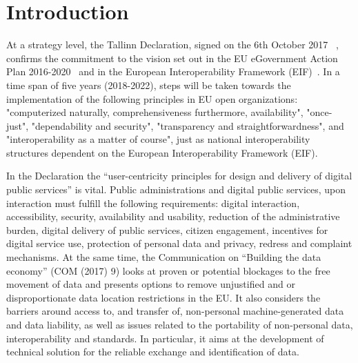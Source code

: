 
\chapter{Introduction}  %

\ifpdf
    \graphicspath{{Chapter1/Figs/Raster/}{Chapter1/Figs/PDF/}{Chapter1/Figs/}}
\else
    \graphicspath{{Chapter1/Figs/Vector/}{Chapter1/Figs/}}
\fi

At a strategy level, the Tallinn Declaration, signed on the 6th October 2017
~\citep{tallin_declaration}, confirms the commitment to the vision set out in the EU eGovernment
Action Plan 2016-2020~\citep{action_plan} and in the European Interoperability Framework (EIF)~\citep{eif}.
In a time span of five years (2018-2022), steps will be taken towards
the implementation of the following principles in EU open organizations: "computerized
naturally, comprehensiveness furthermore, availability", "once-just", "dependability
and security", "transparency and straightforwardness", and "interoperability as a
matter of course", just as national interoperability structures dependent on the
European Interoperability Framework (EIF).

In the Declaration the “user-centricity principles for design and delivery of
digital public services” is vital. Public administrations and digital public services,
upon interaction must fulfill the following requirements: digital interaction, accessibility, security, availability
and usability, reduction of the administrative burden, digital delivery of public services,
citizen engagement, incentives for digital service use, protection of personal data and
privacy, redress and complaint mechanisms. At the same time, the Communication on “Building the data economy” (COM (2017) 9)
looks at proven or potential blockages to the free movement of data and presents
options to remove unjustified and or disproportionate data location restrictions
in the EU. It also considers the barriers around access to, and transfer of,
non-personal machine-generated data and data liability, as well as issues related
to the portability of non-personal data, interoperability and standards.
In particular, it aims at the development of technical solution for
the reliable exchange and identification of data. 


